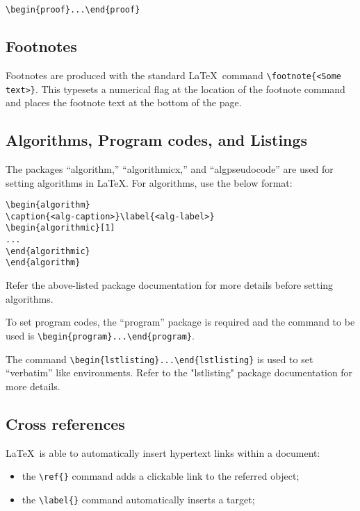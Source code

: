 \documentclass{article}
\begin{document}
\begin{verbatim}
\begin{proof}...\end{proof}
\end{verbatim}

\subsection{Footnotes}

Footnotes are produced with the standard \LaTeX\ command \verb+\footnote{<Some text>}+. This typesets a numerical flag at the location of the footnote command and places the footnote text at the bottom of the page.

\subsection{Algorithms, Program codes, and Listings}

The packages ``algorithm,'' ``algorithmicx,'' and ``algpseudocode'' are used for setting algorithms in \LaTeX. For algorithms, use the below format:

\begin{verbatim}
\begin{algorithm}
\caption{<alg-caption>}\label{<alg-label>}
\begin{algorithmic}[1]
...
\end{algorithmic}
\end{algorithm}
\end{verbatim}
Refer the above-listed package documentation for more details before setting algorithms.

To set program codes, the ``program'' package is required and the command to be used is \verb+\begin{program}...\end{program}+.

The command \verb+\begin{lstlisting}...\end{lstlisting}+ is used to set ``verbatim'' like environments. Refer to the "lstlisting" package documentation for more details.

\subsection{Cross references}

\LaTeX\ is able to automatically insert hypertext links within a document:

\begin{itemize}
\item the \verb+\ref{}+ command adds a clickable link to the referred object;
\item the \verb+\label{}+ command automatically inserts a target;
\end{itemize}
\end{document}
